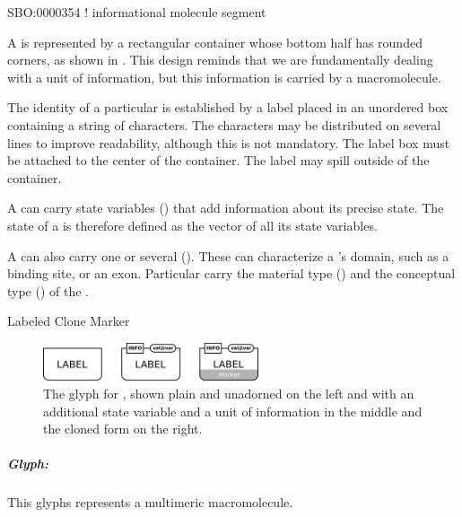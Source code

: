 \begin{glyphDescription}

\glyphSboTerm SBO:0000354 !  informational molecule segment

\glyphContainer A  is represented by a rectangular container whose bottom half has rounded corners, as shown in . This design reminds that we are fundamentally dealing with a unit of information, but this information is carried by a macromolecule.

\glyphLabel The identity of a particular  is established by a label placed in an unordered box containing a string of characters.  The characters may be distributed on several lines to improve readability, although this is not mandatory.  The label box must be attached to the center of the container.  The label may spill outside of the container.

\glyphAux A  can carry state variables () that add information about its precise state.  The state of a  is therefore defined as the vector of all its state variables. 

A  can also carry one or several  ().  These can characterize a 's domain, such as a binding site, or an exon.  Particular  carry the material type () and the conceptual type () of the . 

\glyphCloning Labeled Clone Marker

\end{glyphDescription}


\begin{figure}[H]
  \centering
  \includegraphics[width = 2.5in]{images/genetic}
  \caption{The \PD glyph for , shown plain and
    unadorned on the left and with an additional state variable and a
    unit of information in the middle and the cloned form on the right.} 
  \label{fig:genetic}
\end{figure}

\subparagraph{Glyph: }

This glyphs represents a multimeric macromolecule.

